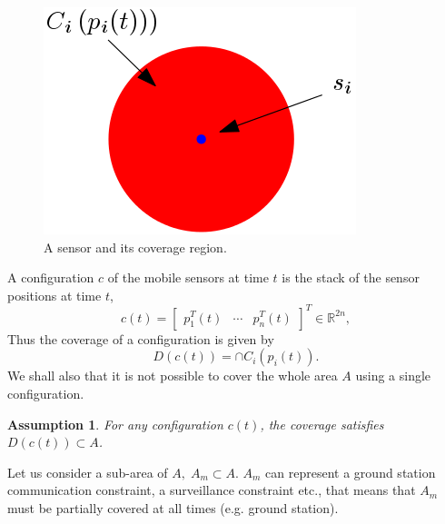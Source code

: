 \documentclass{iacas}
\newcommand{\bmat}[1]{\begin{bmatrix}#1\end{bmatrix}}
\newtheorem{assumption}{Assumption}
\begin{document}
\begin{figure}[H]
\centering
\includegraphics[scale=0.6]{figures/problem-def/sensor-and-coverage.png}
\caption{A sensor and its coverage region.}
\end{figure}

A configuration $c$ of the mobile sensors at time $t$ is the stack of the sensor positions at time $t$,
\begin{equation}
c\left(t\right) = \bmat{
p_{1}^{T}\left(t\right)&\cdots&p_{n}^{T}\left(t\right)}^{T}\in\mathbb{R}^{2n},
\label{eq:configuration definition}
\end{equation}
Thus the coverage of a configuration is given by
\begin{equation*}
D\left( c\left( t \right) \right) = \cap C_i(p_i(t)).
\end{equation*}
We shall also that it is not possible to cover the whole area $A$ using a single configuration.
\begin{assumption}
For any configuration $c(t)$, the coverage satisfies $D\left( c\left( t \right) \right) \subset A$. %
\label{assump: no full coverage}
\end{assumption}

Let us consider a sub-area of $A,\; A_m \subset A$. $A_m$ can represent a ground station communication constraint, a surveillance constraint etc., that means that $A_m$ must be partially covered at all times (e.g. ground station).
\end{document}
